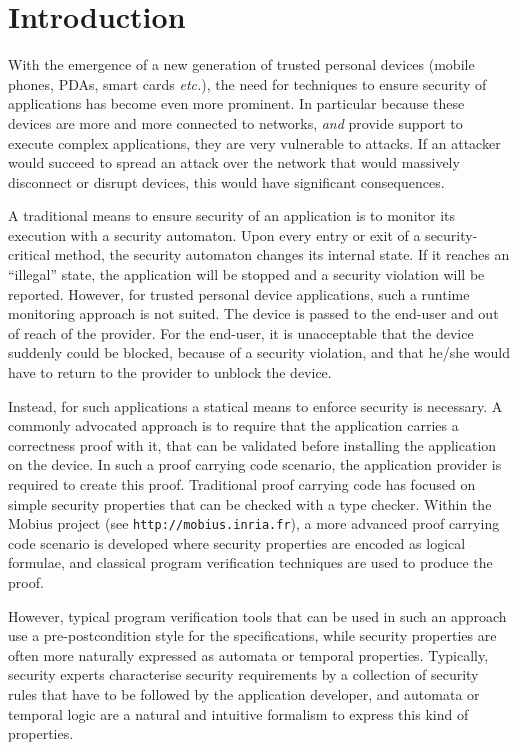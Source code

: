 \section{Introduction}\label{SecIntro}

With the emergence of a new generation of trusted personal devices
(mobile phones, PDAs, smart cards \emph{etc.}), the need for
techniques to ensure security of applications has become even more
prominent. In particular because these devices are more and more
connected to networks, \emph{and} provide support to execute complex
applications, they are very vulnerable to attacks. If an attacker
would succeed to spread an attack over the network that would
massively disconnect or disrupt devices, this would have significant
consequences.


A traditional means to ensure security of an application is to monitor
its execution with a security automaton.  Upon every entry or exit of
a security-critical method, the security automaton changes its
internal state. If it reaches an ``illegal'' state, the application
will be stopped and a security violation will be reported. However,
for trusted personal device applications, such a runtime monitoring
approach is not suited. The device is passed to the end-user and out
of reach of the provider. For the end-user, it is unacceptable that
the device suddenly could be blocked, because of a security violation,
and that he/she would have to return to the provider to unblock the
device.

Instead, for such applications a statical means to enforce security is
necessary. A commonly advocated approach is to require that the application
carries a correctness proof with it, that can be validated before
installing the application on the device. In such a proof carrying
code scenario, the application provider is required to create this
proof. Traditional proof carrying code has focused on simple security
properties that can be checked with a type checker. Within the
\textsf{Mobius} project (see \texttt{http://mobius.inria.fr}), 
a more advanced proof carrying code scenario is developed where
security properties are encoded as logical formulae, and classical
program verification techniques are used to produce the proof.

However, typical program verification tools that can be used in such
an approach use a pre-postcondition style for the specifications,
while security properties are often more naturally expressed as
automata or temporal properties. Typically, security experts
characterise security requirements by a collection of security rules
that have to be followed by the application developer, and automata or
temporal logic are a natural and intuitive formalism to express this
kind of properties.

